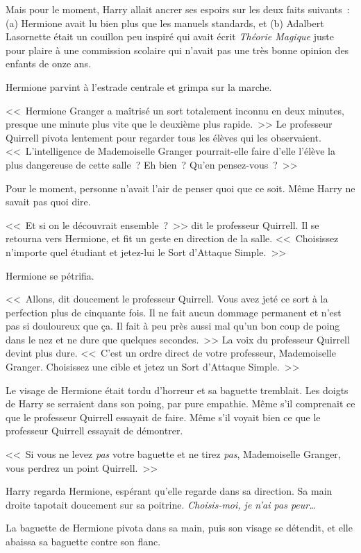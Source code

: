 Mais pour le moment, Harry allait ancrer ses espoirs sur les deux faits suivants~: (a) Hermione avait lu bien plus que les manuels standards, et (b) Adalbert Lasornette était un couillon peu inspiré qui avait écrit \emph{Théorie Magique} juste pour plaire à une commission scolaire qui n'avait pas une très bonne opinion des enfants de onze ans.

Hermione parvint à l'estrade centrale et grimpa sur la marche.

<<~Hermione Granger a maîtrisé un sort totalement inconnu en deux minutes, presque une minute plus vite que le deuxième plus rapide.~>> Le professeur Quirrell pivota lentement pour regarder tous les élèves qui les observaient. <<~L'intelligence de Mademoiselle Granger pourrait-elle faire d'elle l'élève la plus dangereuse de cette salle~? Eh bien~? Qu'en pensez-vous~?~>>

Pour le moment, personne n'avait l'air de penser quoi que ce soit. Même Harry ne savait pas quoi dire.

<<~Et si on le découvrait ensemble~?~>> dit le professeur Quirrell. Il se retourna vers Hermione, et fit un geste en direction de la salle. <<~Choisissez n'importe quel étudiant et jetez-lui le Sort d'Attaque Simple.~>>

Hermione se pétrifia.

<<~Allons, dit doucement le professeur Quirrell. Vous avez jeté ce sort à la perfection plus de cinquante fois. Il ne fait aucun dommage permanent et n'est pas si douloureux que ça. Il fait à peu près aussi mal qu'un bon coup de poing dans le nez et ne dure que quelques secondes.~>> La voix du professeur Quirrell devint plus dure. <<~C'est un ordre direct de votre professeur, Mademoiselle Granger. Choisissez une cible et jetez un Sort d'Attaque Simple.~>>

Le visage de Hermione était tordu d'horreur et sa baguette tremblait. Les doigts de Harry se serraient dans son poing, par pure empathie. Même s'il comprenait ce que le professeur Quirrell essayait de faire. Même s'il voyait bien ce que le professeur Quirrell essayait de démontrer.

<<~Si vous ne levez \emph{pas} votre baguette et ne tirez \emph{pas}, Mademoiselle Granger, vous perdrez un point Quirrell.~>>

Harry regarda Hermione, espérant qu'elle regarde dans sa direction. Sa main droite tapotait doucement sur sa poitrine. \emph{Choisis-moi, je n'ai pas peur…}

La baguette de Hermione pivota dans sa main, puis son visage se détendit, et elle abaissa sa baguette contre son flanc.

